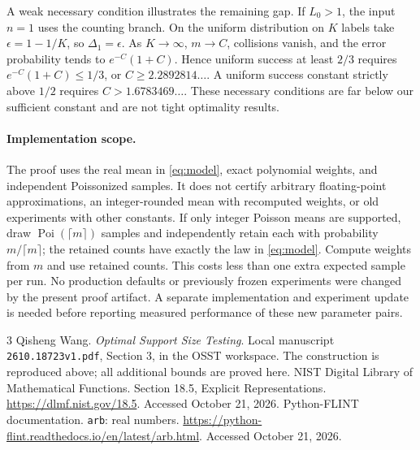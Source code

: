 \documentclass[10pt]{article}
\newcommand{\Poi}{\operatorname{Poi}}
\begin{document}
A weak necessary condition illustrates the remaining gap. If $L_0>1$, the
input $n=1$ uses the counting branch. On the uniform distribution on $K$
labels take $\epsilon=1-1/K$, so $\Delta_1=\epsilon$. As $K\to\infty$,
$m\to C$, collisions vanish, and the error probability tends to
$e^{-C}(1+C)$. Hence uniform success at least $2/3$ requires
$e^{-C}(1+C)\le1/3$, or $C\ge2.2892814\ldots$.
A uniform success constant strictly above $1/2$ requires
$C>1.6783469\ldots$. These necessary conditions are far below our sufficient
constant and are not tight optimality results.

\paragraph{Implementation scope.}
The proof uses the real mean in \eqref{eq:model}, exact polynomial weights,
and independent Poissonized samples. It does not certify arbitrary
floating-point approximations, an integer-rounded mean with recomputed
weights, or old experiments with other constants. If only integer Poisson
means are supported, draw $\Poi(\lceil m\rceil)$ samples and independently
retain each with probability $m/\lceil m\rceil$; the retained counts have
exactly the law in \eqref{eq:model}. Compute weights from $m$ and use retained
counts. This costs less than one extra expected sample per run.
No production defaults or previously frozen experiments were changed by
the present proof artifact. A separate implementation and experiment update
is needed before reporting measured performance of these new parameter pairs.

\begin{thebibliography}{3}
 Qisheng Wang. \emph{Optimal Support Size Testing}.
Local manuscript \texttt{2610.18723v1.pdf}, Section 3, in the OSST workspace.
The construction is reproduced above; all additional bounds are proved here.
 NIST Digital Library of Mathematical Functions.
Section 18.5, Explicit Representations.
\url{https://dlmf.nist.gov/18.5}. Accessed October 21, 2026.
 Python-FLINT documentation. \texttt{arb}: real numbers.
\url{https://python-flint.readthedocs.io/en/latest/arb.html}.
Accessed October 21, 2026.
\end{thebibliography}
\end{document}
